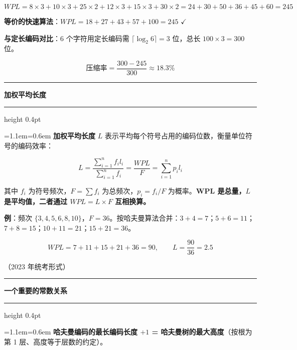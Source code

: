 \documentclass[11pt,openany,UTF8]{ctexbook}
\newcommand{\callouthead}[2]{%
  \par\addvspace{7pt}\noindent
  {\color{#1}\rule[-0.15em]{3pt}{1.05em}}\hspace{0.5em}%
  {\bfseries\color{#1}#2}\par\nobreak\vspace{-0.35em}%
  {\color{rulesep}\hrule height 0.4pt}\nobreak\vspace{0.45em}%
  \begingroup\small\setlength{\parindent}{0pt}%
  \leftskip=1.1em\rightskip=0.6em\noindent\ignorespaces}
\newcommand{\calloutend}{\par\endgroup\addvspace{7pt}}
\newenvironment{callkey}[1]{\callouthead{keybar}{#1}}{\calloutend}
\begin{document}
\[WPL=8\times3+10\times3+25\times2+12\times3+15\times3+30\times2=24+30+50+36+45+60=245\]

\textbf{等价的快速算法}：$WPL=18+27+43+57+100=245$ $\checkmark$

\textbf{与定长编码对比}：6 个字符用定长编码需 $\lceil\log_2 6\rceil=3$ 位，总长 $100\times3=300$ 位。

\[\text{压缩率}=\frac{300-245}{300}\approx18.3\%\]

\begin{callkey}{加权平均长度}
\textbf{加权平均长度} $L$ 表示平均每个符号占用的编码位数，衡量单位符号的编码效率：

\[L=\frac{\sum\limits_{i=1}^{n}f_i l_i}{\sum\limits_{i=1}^{n}f_i}=\frac{WPL}{F}=\sum_{i=1}^{n}p_i l_i\]

其中 $f_i$ 为符号频次，$F=\sum f_i$ 为总频次，$p_i=f_i/F$ 为概率。\textbf{WPL 是总量，$L$ 是平均值，二者通过 $WPL=L\times F$ 互相换算。}

\textbf{例}：频次 $\{3,4,5,6,8,10\}$，$F=36$。按哈夫曼算法合并：$3+4=7$；$5+6=11$；$7+8=15$；$10+11=21$；$15+21=36$。

\[WPL=7+11+15+21+36=90,\qquad L=\frac{90}{36}=2.5\]

（2023 年统考形式）

\end{callkey}

\begin{callkey}{一个重要的常数关系}
\textbf{哈夫曼编码的最长编码长度 $+1$ = 哈夫曼树的最大高度}（按根为第 1 层、高度等于层数的约定）。

\end{callkey}
\end{document}
